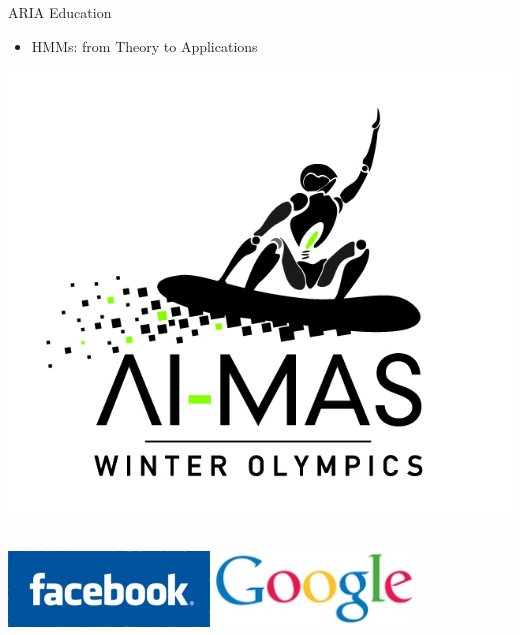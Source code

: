 \documentclass{beamer}
\begin{document}
\begin{frame}[t]
	\begin{center}
		\huge{ARIA Education}\\%
	\end{center}
	
	\begin{itemize}
		\setlength{\itemindent}{3.6em}
		\item \Large{HMMs: from Theory to Applications}
	\end{itemize}
	\pause
	
	\setlength{\itemindent}{0em}
	\begin{center}
		\includegraphics[height=0.45\textheight]{graphics/intro/aiwo-logo}%
	\end{center}
	\pause
	
	\begin{columns}[h]
			\hfill \includegraphics[width=0.4\textwidth]{graphics/intro/facebook-logo}%
			\includegraphics[width=0.4\textwidth]{graphics/intro/google-logo}\hfill\\%
	\end{columns}
\end{frame}
\end{document}
